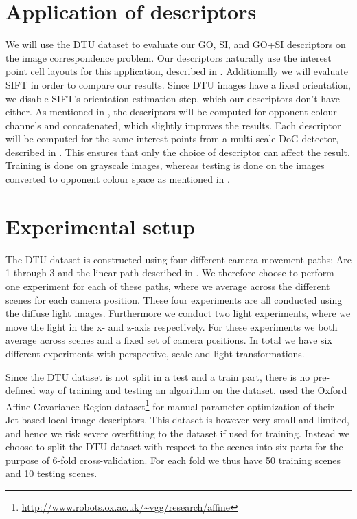 \documentclass[thesis.tex]{subfiles}
\begin{document}
\section{Application of descriptors}
%
We will use the DTU dataset to evaluate our GO, SI, and GO+SI descriptors on the image correspondence problem. Our descriptors naturally use the interest point cell layouts for this application, described in . Additionally we will evaluate SIFT in order to compare our results. Since DTU images have a fixed orientation, we disable SIFT's orientation estimation step, which our descriptors don't have either. As mentioned in , the descriptors will be computed for opponent colour channels and concatenated, which slightly improves the results. Each descriptor will be computed for the same interest points from a multi-scale DoG detector, described in . This ensures that only the choice of descriptor can affect the result. Training is done on grayscale images, whereas testing is done on the images converted to opponent colour space as mentioned in .
%
\section{Experimental setup}
%
The DTU dataset is constructed using four different camera movement paths: Arc 1 through 3 and the linear path described in . We therefore choose to perform one experiment for each of these paths, where we average across the different scenes for each camera position. These four experiments are all conducted using the diffuse light images. Furthermore we conduct two light experiments, where we move the light in the x- and z-axis respectively. For these experiments we both average across scenes and a fixed set of camera positions. In total we have six different experiments with perspective, scale and light transformations.

Since the DTU dataset is not split in a test and a train part, there is no pre-defined way of training and testing an algorithm on the dataset. \citet{larsen2012jet} used the Oxford Affine Covariance Region dataset\footnote{\url{http://www.robots.ox.ac.uk/~vgg/research/affine}} for manual parameter optimization of their Jet-based local image descriptors. This dataset is however very small and limited, and hence we risk severe overfitting to the dataset if used for training. Instead we choose to split the DTU dataset with respect to the scenes into six parts for the purpose of 6-fold cross-validation. For each fold we thus have 50 training scenes and 10 testing scenes.
\end{document}
